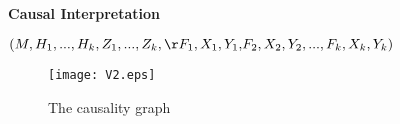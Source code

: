 \documentclass[landscape,dvips,a4]{seminar}
\begin{document}
\begin{slide}
  \begin{center}
    \textbf{\Large Causal Interpretation}
  \end{center}
 \vspace{3mm}
 $(M,H_1,...,H_k,Z_1,...,Z_k,{\r F_1,X_1,Y_1,}F_2,X_2,Y_2,...,F_k,X_k,Y_k)$
\begin{figure*}[t]
  \centering





  \texttt{[image: V2.eps]}
  \caption{The causality graph}
  \label{fig:fig2}
\end{figure*}
\end{slide}
\end{document}
